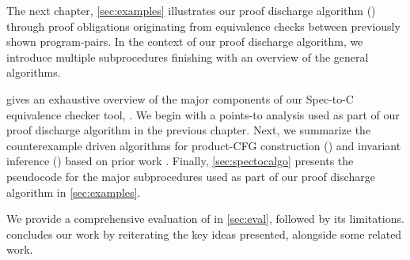 The next chapter, \cref{sec:examples} illustrates our proof discharge algorithm () through
proof obligations originating from equivalence checks between previously shown program-pairs.
In the context of our proof discharge algorithm, we introduce multiple subprocedures finishing with
an overview of the general algorithms.

 gives an exhaustive overview of the major components of our Spec-to-C equivalence checker tool, \toolName{}.
We begin with a points-to analysis used as part of our proof discharge algorithm in the previous chapter.
Next, we summarize the counterexample driven algorithms for product-CFG construction ()
and invariant inference () based on prior work \cite{oopsla20}.
Finally, \cref{sec:spectocalgo} presents the pseudocode for the major subprocedures used as part of our
proof discharge algorithm in \cref{sec:examples}.

We provide a comprehensive evaluation of \toolName{} in \cref{sec:eval}, followed by its limitations.
 concludes our work by reiterating the key ideas presented, alongside some related work.
